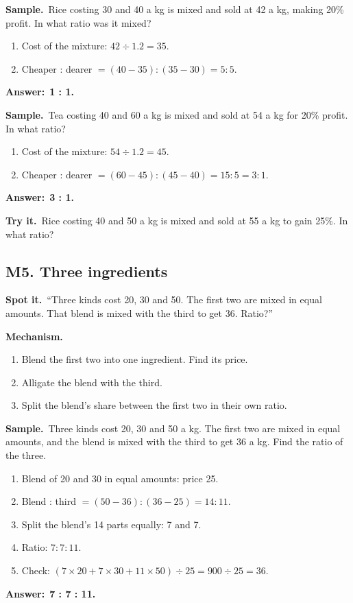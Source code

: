 \documentclass[11pt,a4paper]{article}
\let\oldsubsection\subsection
\renewcommand{\subsection}{\needspace{9\baselineskip}\oldsubsection}
\newcommand{\spot}{\textbf{\color{ember}Spot it.}\ }
\newcommand{\mech}{\textbf{\color{ember}Mechanism.}\ }
\newif\ifkeepsamp
\newcommand{\ans}[1]{\par\nopagebreak\noindent\textbf{\color{ember}Answer:}\ \textbf{#1}\par}
\newcommand{\samp}{\ifkeepsamp\needspace{4\baselineskip}\fi\textbf{\color{ember}Sample.}\ }
\newcommand{\tryit}[1]{\textbf{\color{ember}Try it.}\ #1}
\begin{document}
\samp Rice costing 30 and 40 a kg is mixed and sold at 42 a kg, making 20\% profit. In what ratio was it mixed?
\begin{enumerate}
\item Cost of the mixture: $42 \div 1.2 = 35$.
\item Cheaper : dearer $= (40 - 35) : (35 - 30) = 5 : 5$.
\end{enumerate}
\ans{1 : 1.}

\samp Tea costing 40 and 60 a kg is mixed and sold at 54 a kg for 20\% profit. In what ratio?
\begin{enumerate}
\item Cost of the mixture: $54 \div 1.2 = 45$.
\item Cheaper : dearer $= (60 - 45) : (45 - 40) = 15 : 5 = 3 : 1$.
\end{enumerate}
\ans{3 : 1.}

\tryit Rice costing 40 and 50 a kg is mixed and sold at 55 a kg to gain 25\%. In what ratio?

\subsection{M5. Three ingredients}
\spot ``Three kinds cost 20, 30 and 50. The first two are mixed in equal amounts. That blend is mixed with the third to get 36. Ratio?''

\mech
\begin{enumerate}
\item Blend the first two into one ingredient. Find its price.
\item Alligate the blend with the third.
\item Split the blend's share between the first two in their own ratio.
\end{enumerate}

\samp Three kinds cost 20, 30 and 50 a kg. The first two are mixed in equal amounts, and the blend is mixed with the third to get 36 a kg. Find the ratio of the three.
\begin{enumerate}
\item Blend of 20 and 30 in equal amounts: price 25.
\item Blend : third $= (50 - 36) : (36 - 25) = 14 : 11$.
\item Split the blend's 14 parts equally: 7 and 7.
\item Ratio: $7 : 7 : 11$.
\item Check: $(7 \times 20 + 7 \times 30 + 11 \times 50) \div 25 = 900 \div 25 = 36$.
\end{enumerate}
\ans{7 : 7 : 11.}
\end{document}
